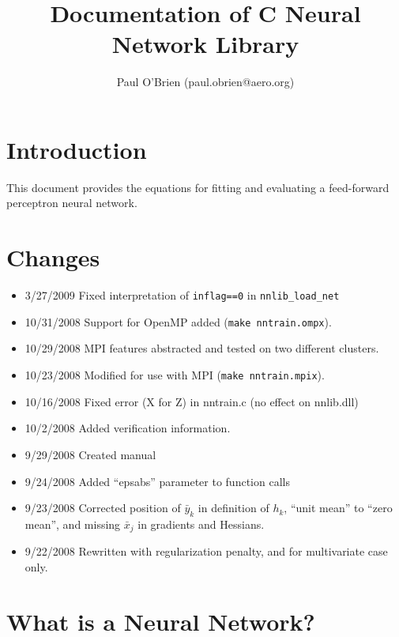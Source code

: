 \documentclass{article}    %
\title{Documentation of C Neural Network Library}
\author{Paul O'Brien (paul.obrien@aero.org)}         %
\begin{document}

\maketitle                 %

\tableofcontents

\section{Introduction}

This document provides the equations for fitting and evaluating a
feed-forward perceptron neural network.

\section{Changes}

\begin{itemize}
\item{3/27/2009} Fixed interpretation of \verb|inflag==0| in \verb|nnlib_load_net|
\item{10/31/2008} Support for OpenMP added (\verb|make nntrain.ompx|).
\item{10/29/2008} MPI features abstracted and tested on two different clusters.
\item{10/23/2008} Modified for use with MPI (\verb|make nntrain.mpix|).
\item{10/16/2008} Fixed error (X for Z) in nntrain.c (no effect on nnlib.dll)
\item{10/2/2008} Added verification information.
\item{9/29/2008} Created manual
\item{9/24/2008} Added ``epsabs'' parameter to function calls
\item{9/23/2008} Corrected position of $\bar{y}_k$ in definition of
  $h_k$, ``unit mean'' to ``zero mean'', and missing $\bar{x}_{j}$ in
  gradients and Hessians.
\item{9/22/2008} Rewritten with regularization penalty, and for multivariate case only.
\end{itemize}

\section{What is a Neural Network?}
\end{document}
